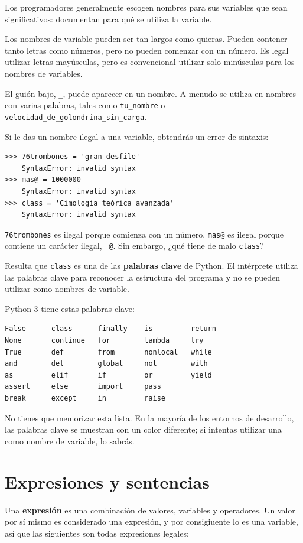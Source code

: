 \documentclass[10pt]{book}
\begin{document}
Los programadores generalmente escogen nombres para sus variables que
sean significativos: documentan para qué se utiliza la variable.

Los nombres de variable pueden ser tan largos como quieras.  Pueden contener
tanto letras como números, pero no pueden comenzar con un número.
Es legal utilizar letras mayúsculas, pero es convencional
utilizar solo minúsculas para los nombres de variables.

El guión bajo, \verb"_", puede aparecer en un nombre.
A menudo se utiliza en nombres con varias palabras, tales como
\verb"tu_nombre" o \verb"velocidad_de_golondrina_sin_carga".

Si le das un nombre ilegal a una variable, obtendrás un error de sintaxis:

\begin{verbatim}
>>> 76trombones = 'gran desfile'
    SyntaxError: invalid syntax
>>> mas@ = 1000000
    SyntaxError: invalid syntax
>>> class = 'Cimología teórica avanzada'
    SyntaxError: invalid syntax
\end{verbatim}
%
{\tt 76trombones} es ilegal porque comienza con un número.
{\tt mas@} es ilegal porque contiene un carácter ilegal, {\tt
@}.  Sin embargo, ¿qué tiene de malo {\tt class}?

Resulta que {\tt class} es una de las {\bf palabras clave} de Python.  El
intérprete utiliza las palabras clave para reconocer la estructura del programa
y no se pueden utilizar como nombres de variable.

Python 3 tiene estas palabras clave:

\begin{verbatim}
False      class      finally    is         return
None       continue   for        lambda     try
True       def        from       nonlocal   while
and        del        global     not        with
as         elif       if         or         yield
assert     else       import     pass
break      except     in         raise
\end{verbatim}
%
No tienes que memorizar esta lista.  En la mayoría de los entornos de desarrollo,
las palabras clave se muestran con un color diferente; si intentas utilizar una
como nombre de variable, lo sabrás.


\section{Expresiones y sentencias}

Una {\bf expresión} es una combinación de valores, variables y operadores.
Un valor por sí mismo es considerado una expresión, y por consigiuente lo es
una variable, así que las siguientes son todas expresiones legales:
\end{document}
